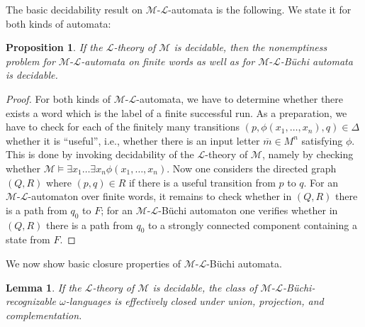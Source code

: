 \documentclass[copyright,creativecommons]{eptcs}
\newtheorem{lemma}[theorem]{Lemma}
\newtheorem{proposition}[theorem]{Proposition}
\theoremstyle{plain}
\theoremstyle{nonumberplain}
\newtheorem{proof}{Proof}
\newcommand{\m}{\ensuremath{\mathcal{M}}}
\newcommand{\el}{\ensuremath{\mathcal{L}}}
\newcommand{\ml}{\ensuremath{\m\textrm{-}\el}}
\begin{document}
The basic decidability result on \ml-automata is the following. We state it 
for both kinds of automata: 

\begin{proposition}\label{prop:emptinessbuechi}
If the $\el$-theory of $\m$ is decidable, then the nonemptiness problem 
for \ml-automata on finite words as well as for \ml-B{\"u}chi automata is decidable.
\end{proposition}

\begin{proof}
For both kinds of \ml-automata, we have to determine whether there exists 
a word which is the label of a finite successful run. As a preparation, 
we have to check for each of the finitely many transitions $(p,\phi(x_1, \ldots ,x_n),q) \in \Delta$ 
whether it is ``useful'', i.e., whether 
there is an input letter $\overline{m} \in M^n$ satisfying 
$\phi$. This is done by invoking decidability of the $\el$-theory of $\m$, 
namely by checking whether $\m \models \exists x_1 \ldots \exists x_n \phi(x_1, \ldots, x_n)$. 
Now one considers the directed graph $(Q,R)$ where $(p,q) \in R$ if there is a useful
transition from $p$ to $q$. For an \ml-automaton over finite words, it remains to check whether 
in $(Q,R)$ there is a path from $q_0$ to $F$; for an \ml-B\"uchi automaton one verifies whether
in $(Q,R)$ there is a path from $q_0$ to a strongly connected component containing a state from $F$.
\end{proof}

We now show basic closure properties of \ml-B\"uchi automata.


\begin{lemma}\label{lem:mlbuechiclosure}
If the $\el$-theory of $\m$ is decidable, 
the class of \ml-B{\"u}chi-recognizable $\omega$-languages is effectively closed 
under union, projection, and complementation.
\end{lemma}
\end{document}
